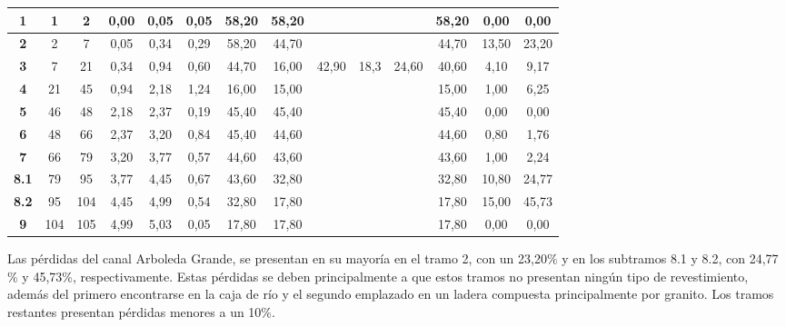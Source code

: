 \documentclass[]{article}
\begin{document}
\begin{landscape}
\begin{table}[H]
{\begin{tabular}{|c|c|c|c|c|c|c|c|c|c|c|c|c|c|}
{\color[HTML]{FE0000} \textbf{1}} & {\color[HTML]{FE0000} \textbf{1}} & {\color[HTML]{FE0000} \textbf{2}} & {\color[HTML]{FE0000} \textbf{0,00}}& {\color[HTML]{FE0000} \textbf{0,05}} & {\color[HTML]{FE0000} \textbf{0,05}} & {\color[HTML]{FE0000} \textbf{58,20}} & {\color[HTML]{FE0000} \textbf{58,20}} & & & & {\color[HTML]{FE0000} \textbf{58,20}} & {\color[HTML]{FE0000} \textbf{0,00}} & {\color[HTML]{FE0000} \textbf{0,00}} \\ \hline
\textbf{2} & 2 & 7 & 0,05 & 0,34 & 0,29 & 58,20 & 44,70 & & & & 44,70 & 13,50 & 23,20 \\ \hline
\textbf{3} & 7 & 21 & 0,34 & 0,94 & 0,60 & 44,70 & 16,00 & 42,90 & 18,3 & 24,60 & 40,60 & 4,10 & 9,17 \\ \hline
\textbf{4} & 21 & 45 & 0,94 & 2,18 & 1,24 & 16,00 & 15,00 & & & & 15,00 & 1,00 & 6,25 \\ \hline                                                                                             
\textbf{5} & 46 & 48 & 2,18 & 2,37 & 0,19 & 45,40 & 45,40 & & & & 45,40 & 0,00 & 0,00 \\ \hline                                                                                      
\textbf{6} & 48 & 66 & 2,37 & 3,20 & 0,84 & 45,40 & 44,60 & & & & 44,60 & 0,80 & 1,76 \\ \hline
\textbf{7} & 66 & 79 & 3,20 & 3,77 & 0,57 & 44,60 & 43,60 & & & & 43,60 & 1,00 & 2,24 \\ \hline                                                                                                                                                                            
\textbf{8.1} & 79 & 95 & 3,77 & 4,45 & 0,67 & 43,60 & 32,80 & & & & 32,80 & 10,80 & 24,77 \\ \hline                                                                                      
\textbf{8.2} & 95 & 104 & 4,45 & 4,99 & 0,54 & 32,80 & 17,80 & & & & 17,80 & 15,00 & 45,73 \\ \hline
\textbf{9} & 104 & 105 & 4,99 & 5,03 & 0,05 & 17,80 & 17,80 & & & & 17,80 & 0,00 & 0,00 \\ \hline
\end{tabular}
}
\end{table}

Las pérdidas del canal Arboleda Grande, se presentan en su mayoría en el tramo 2, con un 23,20$\%$ y en los subtramos 8.1 y 8.2, con 24,77$\%$ y 45,73$\%$, respectivamente. Estas pérdidas se deben principalmente a que estos tramos no presentan ningún tipo de revestimiento, además del primero encontrarse en la caja de río y el segundo emplazado en un ladera compuesta principalmente por granito. Los tramos restantes presentan pérdidas menores a un 10$\%$.


\end{landscape}
\end{document}
